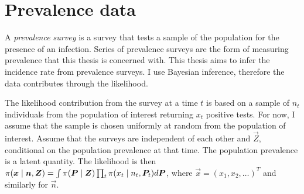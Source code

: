 \documentclass[thesis.tex]{subfiles}
\begin{document}

\section{Prevalence data}

A \emph{prevalence survey} is a survey that tests a sample of the population for the presence of an infection.
Series of prevalence surveys are the form of measuring prevalence that this thesis is concerned with.
This thesis aims to infer the incidence rate from prevalence surveys.
I use Bayesian inference, therefore the data contributes through the likelihood.

The likelihood contribution from the survey at a time $t$ is based on a sample of $n_t$ individuals from the population of interest returning $x_t$ positive tests.
For now, I assume that the sample is chosen uniformly at random from the population of interest.
Assume that the surveys are independent of each other and $\vec{Z}$, conditional on the population prevalence at that time.
The population prevalence is a latent quantity.
The likelihood is then $\operatorname{\pi}(\bm{x} \mid \bm{n}, \bm{Z}) = \int \operatorname{\pi}(\bm{P} \mid \bm{Z}) \prod_t \operatorname{\pi}(x_t \mid n_t, \bm{P}_t) d\bm{P}$, where $\vec{x} = (x_1, x_2, \dots)^T$ and similarly for $\vec{n}$.
\end{document}
